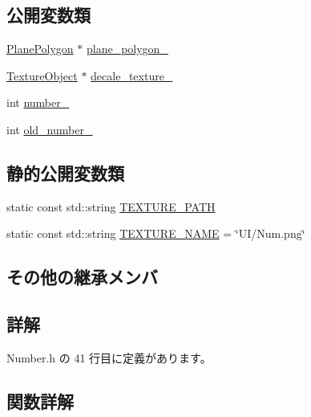 \subsection*{公開変数類}
\begin{DoxyCompactItemize}
\item 
\mbox{\hyperlink{class_plane_polygon}{Plane\+Polygon}} $\ast$ \mbox{\hyperlink{class_number_a588084d69c46b02ddb608448724cfe11}{plane\+\_\+polygon\+\_\+}}
\item 
\mbox{\hyperlink{class_texture_object}{Texture\+Object}} $\ast$ \mbox{\hyperlink{class_number_a305385aaec293089117c50fd1cf2575f}{decale\+\_\+texture\+\_\+}}
\item 
int \mbox{\hyperlink{class_number_a8c3235a3442303d4ef950fef5eb7b34c}{number\+\_\+}}
\item 
int \mbox{\hyperlink{class_number_acd5422010e99cbf61196094a9b501115}{old\+\_\+number\+\_\+}}
\end{DoxyCompactItemize}
\subsection*{静的公開変数類}
\begin{DoxyCompactItemize}
\item 
static const std\+::string \mbox{\hyperlink{class_number_a0018ed63d70f4dde3c64bf99df7978ce}{T\+E\+X\+T\+U\+R\+E\+\_\+\+P\+A\+TH}}
\item 
static const std\+::string \mbox{\hyperlink{class_number_a43c6583cef6d8d32b8de6683f80bdb59}{T\+E\+X\+T\+U\+R\+E\+\_\+\+N\+A\+ME}} = \char`\"{}UI/Num.\+png\char`\"{}
\end{DoxyCompactItemize}
\subsection*{その他の継承メンバ}


\subsection{詳解}


 Number.\+h の 41 行目に定義があります。



\subsection{関数詳解}
\mbox{\label{class_number_ad92c9038810d0f831fdb9b5b13901b79}} 
